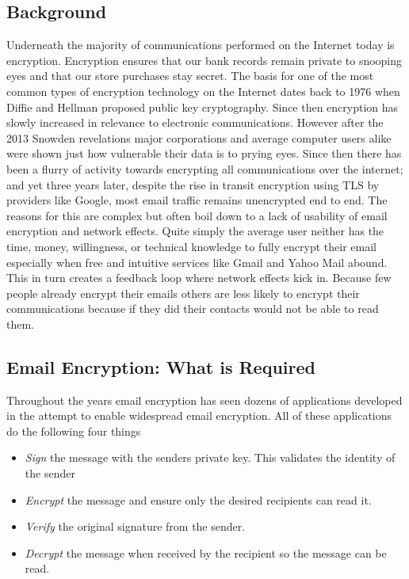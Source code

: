 \documentclass[10pt]{article}
\begin{document}
\begin{multicols}{2}
\section{Background}
\par Underneath the majority of communications performed on the Internet today is encryption. Encryption ensures that our bank records remain private to snooping eyes and that our store purchases stay secret. The basis for one of the most common types of encryption technology on the Internet dates back to 1976 when Diffie and Hellman proposed public key cryptography. Since then encryption has slowly increased in relevance to electronic communications. However after the 2013 Snowden revelations major corporations and average computer users alike were shown just how vulnerable their data is to prying eyes. Since then there has been a flurry of activity towards encrypting all communications over the internet\cite{wired-encrypted-traffic}; and yet three years later, despite the rise in transit encryption using TLS by providers like Google\cite{gmail-tls-report}, most email traffic remains unencrypted end to end. The reasons for this are complex but often boil down to a lack of usability of email encryption and network effects. Quite simply the average user neither has the time, money, willingness, or technical knowledge to fully encrypt their email especially when free and intuitive services like Gmail and Yahoo Mail abound\cite{garfinkel2005make}. This in turn creates a feedback loop where network effects kick in. Because few people already encrypt their emails others are less likely to encrypt their communications because if they did their contacts would not be able to read them\cite{dingledine2006anonymity}.

\subsection{Email Encryption: What is Required}
Throughout the years email encryption has seen dozens of applications developed in the attempt to enable widespread email encryption. All of these applications do the following four things

\begin{itemize}
  \item \textit{Sign} the message with the senders private key. This validates the identity of the sender
  \item \textit{Encrypt} the message and ensure only the desired recipients can read it.
  \item \textit{Verify} the original signature from the sender.
  \item \textit{Decrypt} the message when received by the recipient so the message can be read.
\end{itemize}


\end{multicols}
\end{document}
